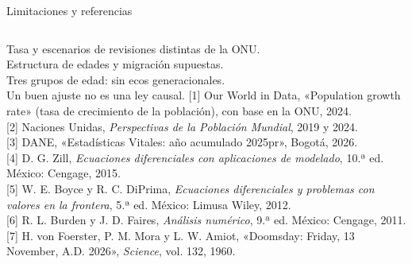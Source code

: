 \documentclass[aspectratio=169,11pt]{beamer}
\begin{document}
\begin{frame}{Limitaciones y referencias}
\begin{columns}[T]
\small
Tasa y escenarios de revisiones distintas de la ONU.\\[6pt]
Estructura de edades y migración supuestas.\\[6pt]
Tres grupos de edad: sin ecos generacionales.\\[6pt]
Un buen ajuste no es una ley causal.
\scriptsize
[1] Our World in Data, «Population growth rate» (tasa de crecimiento de la población), con base en la ONU, 2024.\\[2pt]
[2] Naciones Unidas, \textit{Perspectivas de la Población Mundial}, 2019 y 2024.\\[2pt]
[3] DANE, «Estadísticas Vitales: año acumulado 2025pr», Bogotá, 2026.\\[2pt]
[4] D. G. Zill, \textit{Ecuaciones diferenciales con aplicaciones de modelado}, 10.ª ed. México: Cengage, 2015.\\[2pt]
[5] W. E. Boyce y R. C. DiPrima, \textit{Ecuaciones diferenciales y problemas con valores en la frontera}, 5.ª ed. México: Limusa Wiley, 2012.\\[2pt]
[6] R. L. Burden y J. D. Faires, \textit{Análisis numérico}, 9.ª ed. México: Cengage, 2011.\\[2pt]
[7] H. von Foerster, P. M. Mora y L. W. Amiot, «Doomsday: Friday, 13 November, A.D. 2026», \textit{Science}, vol. 132, 1960.
\end{columns}
\end{frame}
\end{document}
